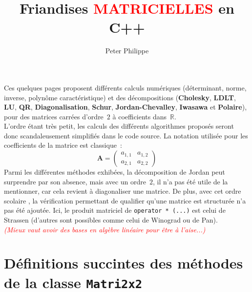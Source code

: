 \documentclass[11pt]{article}
\title{\Huge Friandises \textcolor{red}{\textbf{MATRICIELLES}} en \textbf{C++}}
\author{Peter Philippe}
\newcommand{\R}{\mathbf{\mathds{R}}}
\newcommand{\mb}[1]{\mathbf{#1}}
\let\mathds\mathbb
\begin{document}
\maketitle
Ces quelques pages proposent diff\'erents calculs num\'eriques (d\'eterminant, norme, inverse, polyn\^ome caract\'eristique) et des d\'ecompositions (\textbf{Cholesky}, \textbf{LDLT}, \textbf{LU},
\textbf{QR}, \textbf{Diagonalisation}, \textbf{Schur}, \textbf{Jordan-Chevalley}, \textbf{Iwasawa} et \textbf{Polaire}),
pour des matrices carr\'ees d'ordre~$2$ \`a coefficients dans~$\R$.\\

L'ordre \'etant tr\`es petit, les calculs des diff\'erents algorithmes propos\'es seront donc scandaleusement simplifi\'es dans le code source. La notation utilis\'ee pour les coefficients de
la matrice est classique~:
\[
\mb{A}=
\begin{pmatrix}
a_{1,1} & a_{1,2} \\
a_{2,1} & a_{2,2}
\end{pmatrix}
\]
Parmi les diff\'erentes m\'ethodes exhib\'ees, la d\'ecomposition de Jordan peut surprendre par son absence, mais avec un ordre~$2$, il n'a pas \'et\'e utile
de la mentionner, car cela revient \`a diagonaliser une matrice. De plus, avec cet ordre \og scolaire \fg, la v\'erification permettant de qualifier qu'une matrice
est structur\'ee n'a pas \'et\'e ajout\'ee. Ici, le produit matriciel de \texttt{operator * (...)} est celui de Strassen (d'autres sont possibles comme celui de Winograd
ou de Pan).\\

\tiny{\textcolor{red}{\textit{(Mieux vaut avoir des bases en alg\`ebre lin\'eaire pour \^etre \`a l'aise...)}}}\normalsize

\section{Définitions succintes des méthodes de la classe \texttt{Matri2x2}}
\end{document}

